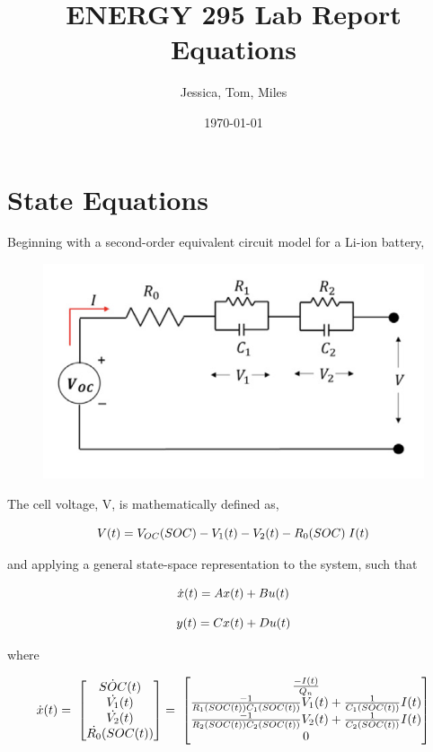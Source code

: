 \documentclass[12pt]{article}
\begin{document}
\title{ENERGY 295 Lab Report Equations}
\date{\today}
\author{Jessica, Tom, Miles}

\maketitle
\tableofcontents
\clearpage

\section{State Equations}
\par
Beginning with a second-order equivalent circuit model for a Li-ion battery,

\begin{figure}[h]
\centering
\includegraphics{ECM.png}
\end{figure}

The cell voltage, V, is mathematically defined as,

\begin{equation}
\centering
V(t) = V_{OC}(SOC) - V_1(t) - V_2(t) - R_0(SOC)\;I(t)
\end{equation}


and applying a general state-space representation to the system, such that

\begin{equation}
\centering
\dot{x}(t) = Ax(t) + Bu(t)
\end{equation}

\begin{equation}
\centering
y(t) =  Cx(t) + Du(t)
\end{equation}

where

\begin{equation}
\centering
\dot{x}(t) = \;
\begin{bmatrix}
\dot{SOC} (t) \\
\dot{V_1} (t) \\
\dot{V_2} (t) \\
\dot{R_0} (SOC(t)) \\
\end{bmatrix} 
= \;
\begin{bmatrix}
\frac{-I(t)}{Q_n} \\
\frac{-1}{R_1(SOC(t))C_1(SOC(t))}V_1(t) + \frac{1}{C_1(SOC(t))}I(t) \\
\frac{-1}{R_2(SOC(t))C_2(SOC(t))}V_2(t) + \frac{1}{C_2(SOC(t))}I(t) \\
0
\end{bmatrix}
\end{equation}
\end{document}
